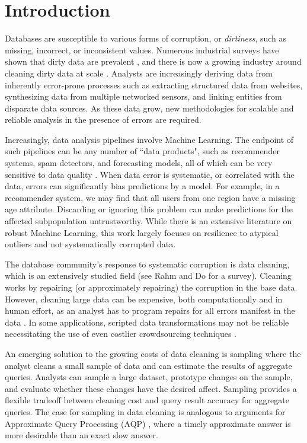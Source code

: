 \section{Introduction}
Databases are susceptible to various forms of corruption, or \emph{dirtiness}, such as missing, incorrect, or inconsistent values.
Numerous industrial surveys have shown that dirty data are prevalent \cite{Gartner}, and there is now a growing industry around cleaning dirty data at scale \cite{fortunearticle}.
Analysts are increasingly deriving data from inherently error-prone processes such as extracting structured data from websites, synthesizing data from multiple networked sensors, and linking entities from disparate data sources.
As these data grow, new methodologies for scalable and reliable analysis in the presence of errors are required. 

Increasingly, data analysis pipelines involve Machine Learning.
The endpoint of such pipelines can be any number of ``data products", such as recommender systems, spam detectors, and forecasting models, all of which can be very sensitive to data quality \cite{xiaofeature}.
When data error is systematic, or correlated with the data, errors can significantly bias predictions by a model.
For example, in a recommender system, we may find that all users from one region have a missing age attribute.
Discarding or ignoring this problem can make predictions for the affected subpopulation untrustworthy.
While there is an extensive literature on robust Machine Learning, this work largely focuses on resilience to atypical outliers and not systematically corrupted data.

The database community's response to systematic corruption is data cleaning, which is an extensively studied field (see Rahm and Do \cite{rahm2000data} for a survey).
Cleaning works by repairing (or approximately repairing) the corruption in the base data.
However, cleaning large data can be expensive, both computationally and in human effort, as an analyst has to program repairs for all errors manifest in the data \cite{kandel2012}.
In some applications, scripted data transformations may not be reliable necessitating the use of even costlier crowdsourcing techniques \cite{gokhale2014corleone,park2014crowdfill}.

An emerging solution to the growing costs of data cleaning is sampling \cite{wang1999sample} where the analyst cleans a small sample of data and can estimate the results of aggregate queries.
Analysts can sample a large dataset, prototype changes on the sample, and evaluate whether these changes have the desired affect.
Sampling provides a flexible tradeoff between cleaning cost and query result accuracy for aggregate queries.
The case for sampling in data cleaning is analogous to arguments for Approximate Query Processing (AQP) \cite{DBLP:conf/eurosys/AgarwalMPMMS13}, where a timely approximate answer is more desirable than an exact slow answer. 

